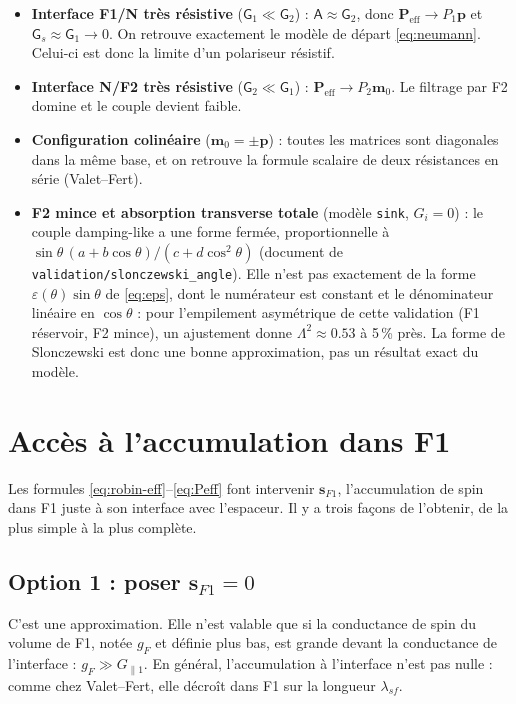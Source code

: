 \documentclass[11pt,a4paper]{article}
\newcommand{\vm}{\bm{m}}
\newcommand{\vp}{\bm{p}}
\newcommand{\vs}{\bm{s}}
\newcommand{\mG}{\mathsf{G}}
\newcommand{\mA}{\mathsf{A}}
\begin{document}
\begin{itemize}
  \item \textbf{Interface F1/N très résistive}
    ($\mG_1\ll\mG_2$) : $\mA\approx\mG_2$, donc
    $\bm{P}_{\!\mathrm{eff}}\to P_1\vp$ et $\mG_s\approx\mG_1\to0$.
    On retrouve exactement le modèle de départ \eqref{eq:neumann}.
    Celui-ci est donc la limite d'un polariseur résistif.
  \item \textbf{Interface N/F2 très résistive}
    ($\mG_2\ll\mG_1$) : $\bm{P}_{\!\mathrm{eff}}\to P_2\vm_0$. Le
    filtrage par F2 domine et le couple devient faible.
  \item \textbf{Configuration colinéaire} ($\vm_0=\pm\vp$) : toutes les
    matrices sont diagonales dans la même base, et on retrouve la formule
    scalaire de deux résistances en série (Valet--Fert).
  \item \textbf{F2 mince et absorption transverse totale} (modèle
    \texttt{sink}, $G_i = 0$) : le couple damping-like a une forme fermée,
    proportionnelle à $\sin\theta\,(a + b\cos\theta)/(c + d\cos^2\theta)$
    (document de \texttt{validation/slonczewski\_angle}). Elle n'est pas
    exactement de la forme $\varepsilon(\theta)\sin\theta$ de
    \eqref{eq:eps}, dont le numérateur est constant et le dénominateur
    linéaire en $\cos\theta$ : pour l'empilement asymétrique de cette
    validation (F1 réservoir, F2 mince), un ajustement donne
    $\Lambda^2\approx0.53$ à 5\,\% près. La forme de Slonczewski est donc
    une bonne approximation, pas un résultat exact du modèle.
\end{itemize}

\section{Accès à l'accumulation dans F1}
\label{sec:sF1}

Les formules \eqref{eq:robin-eff}--\eqref{eq:Peff} font intervenir
$\vs_{F1}$, l'accumulation de spin dans F1 juste à son interface avec
l'espaceur. Il y a trois façons de l'obtenir, de la plus simple à la plus
complète.

\subsection{Option 1 : poser \texorpdfstring{$\vs_{F1}=0$}{sF1 = 0}}

C'est une approximation. Elle n'est valable que si la conductance de spin du
volume de F1, notée $g_F$ et définie plus bas, est grande devant la
conductance de l'interface : $g_F\gg G_{\parallel1}$. En général,
l'accumulation à l'interface n'est pas nulle : comme chez Valet--Fert, elle
décroît dans F1 sur la longueur $\lambda_{sf}$.
\end{document}
